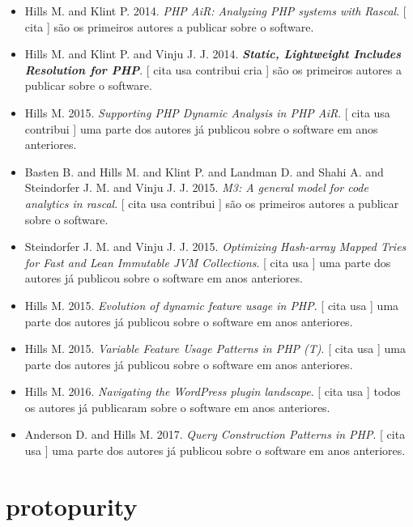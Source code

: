 \begin{itemize}
\item Hills M. and Klint P.
      2014.
        \textit{ PHP AiR: Analyzing PHP systems with Rascal}.
      [
          cita
      ]
são os primeiros autores a publicar sobre o software.
\item Hills M. and Klint P. and Vinju J. J.
      2014.
        \textbf{\textit{ Static, Lightweight Includes Resolution for PHP}}.
      [
          cita
          usa
          contribui
          cria
      ]
são os primeiros autores a publicar sobre o software.
\item Hills M.
      2015.
        \textit{ Supporting PHP Dynamic Analysis in PHP AiR}.
      [
          cita
          usa
          contribui
      ]
uma parte dos autores já publicou sobre o software em anos anteriores.
\item Basten B. and Hills M. and Klint P. and Landman D. and Shahi A. and Steindorfer J. M. and Vinju J. J.
      2015.
        \textit{ M3: A general model for code analytics in rascal}.
      [
          cita
          usa
          contribui
      ]
são os primeiros autores a publicar sobre o software.
\item Steindorfer J. M. and Vinju J. J.
      2015.
        \textit{ Optimizing Hash-array Mapped Tries for Fast and Lean Immutable JVM Collections}.
      [
          cita
          usa
      ]
uma parte dos autores já publicou sobre o software em anos anteriores.
\item Hills M.
      2015.
        \textit{ Evolution of dynamic feature usage in PHP}.
      [
          cita
          usa
      ]
uma parte dos autores já publicou sobre o software em anos anteriores.
\item Hills M.
      2015.
        \textit{ Variable Feature Usage Patterns in PHP (T)}.
      [
          cita
          usa
      ]
uma parte dos autores já publicou sobre o software em anos anteriores.
\item Hills M.
      2016.
        \textit{ Navigating the WordPress plugin landscape}.
      [
          cita
          usa
      ]
todos os autores já publicaram sobre o software em anos anteriores.
\item Anderson D. and Hills M.
      2017.
        \textit{ Query Construction Patterns in PHP}.
      [
          cita
          usa
      ]
uma parte dos autores já publicou sobre o software em anos anteriores.
\end{itemize}
\section{protopurity}

